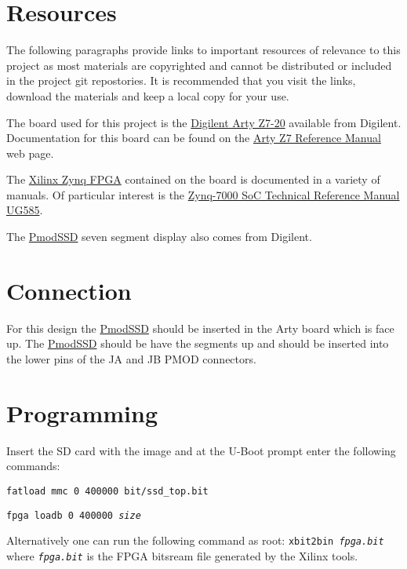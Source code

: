 \documentclass{report}
\begin{document}
\chapter{Resources}
The following paragraphs provide links to important resources of
relevance to this project as most materials are copyrighted and
cannot be distributed or included in the project git repostories.
It is recommended that you visit the links, download the materials
and keep a local copy for your use.

The board used for this project is the 
\href{https://digilent.com/shop/arty-z7-zynq-7000-soc-development-board/}
{Digilent Arty Z7-20}
available from Digilent.  Documentation for this board can be found on the
\href{https://digilent.com/reference/programmable-logic/arty-z7/reference-manual?redirect=1}
{Arty Z7 Reference Manual} web page. 

The \href{http://www.xilinx.com/products/spartan6/index.htm}
{Xilinx Zynq FPGA} contained on the board is documented in a variety
of manuals.  Of particular interest is the
\href{https://docs.xilinx.com/v/u/en-US/ug585-Zynq-7000-TRM}
{Zynq-7000 SoC Technical Reference Manual UG585}.

The 
\href{https://digilent.com/reference/pmod/pmodssd/reference-manual?redirect=1}
{PmodSSD} seven segment display also comes from Digilent.

\chapter{Connection}
For this design the
\href{https://digilent.com/reference/pmod/pmodssd/reference-manual?redirect=1}
{PmodSSD} should be inserted in the Arty board which is face up.
The \href{https://digilent.com/reference/pmod/pmodssd/reference-manual?redirect=1}
{PmodSSD} should be have the segments up and should be inserted into the lower
pins of the JA and JB PMOD connectors.


\chapter{Programming}
Insert the SD card with the image and at the U-Boot prompt enter the following
commands:

\texttt{fatload mmc 0 400000 bit/ssd\_top.bit}

\texttt{fpga loadb 0 400000 \textit{size}}

Alternatively one can run the following command as root:
\texttt{xbit2bin \textit{fpga.bit}} where \texttt{\textit{fpga.bit}} is the
FPGA bitsream file generated by the Xilinx tools.
\end{document}
